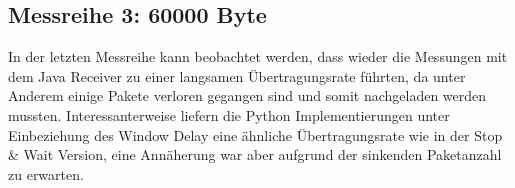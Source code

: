 \documentclass{article}
\begin{document}
    \begin{table}[]
        \caption{Paketlänge: 1400}
        \label{tab:my-tablev3_1400}
    \end{table}

    \subsection{Messreihe 3: 60000 Byte}
    In der letzten Messreihe kann beobachtet werden, dass wieder die Messungen mit dem Java Receiver zu einer
    langsamen Übertragungsrate führten, da unter Anderem einige Pakete verloren gegangen sind und somit
    nachgeladen werden mussten.
    Interessanterweise liefern die Python Implementierungen unter Einbeziehung des Window Delay eine ähnliche
    Übertragungsrate wie in der Stop & Wait Version, eine Annäherung war aber aufgrund der sinkenden Paketanzahl zu
    erwarten.
\end{document}
